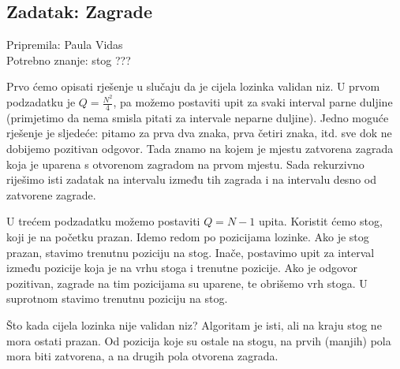 \subsection*{Zadatak: Zagrade}
\textsf{Pripremila: Paula Vidas}\\
\textsf{Potrebno znanje: stog ???}

Prvo ćemo opisati rješenje u slučaju da je cijela lozinka validan niz. U prvom
podzadatku je $Q = \frac{N^2}{4}$, pa možemo postaviti upit za svaki interval
parne duljine (primjetimo da nema smisla pitati za intervale neparne duljine).
Jedno moguće rješenje je sljedeće: pitamo za prva dva znaka, prva četiri znaka,
itd. sve dok ne dobijemo pozitivan odgovor. Tada znamo na kojem je mjestu
zatvorena zagrada koja je uparena s otvorenom zagradom na prvom mjestu. Sada
rekurzivno riješimo isti zadatak na intervalu između tih zagrada i na intervalu
desno od zatvorene zagrade.

U trećem podzadatku možemo postaviti $Q = N - 1$ upita. Koristit ćemo stog, koji
je na početku prazan. Idemo redom po pozicijama lozinke. Ako je stog prazan,
stavimo trenutnu poziciju na stog. Inače, postavimo upit za interval između
pozicije koja je na vrhu stoga i trenutne pozicije. Ako je odgovor pozitivan,
zagrade na tim pozicijama su uparene, te obrišemo vrh stoga. U suprotnom stavimo
trenutnu poziciju na stog.

Što kada cijela lozinka nije validan niz? Algoritam je isti, ali na kraju stog
ne mora ostati prazan. Od pozicija koje su ostale na stogu, na prvih (manjih)
pola mora biti zatvorena, a na drugih pola otvorena zagrada.
